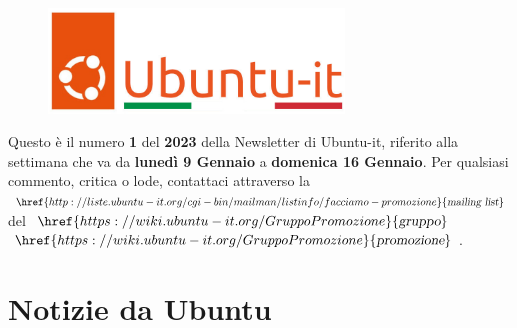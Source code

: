 \documentclass[a4paper,twoside]{article}
\begin{document}
\begin{figure}[!h]
\centering
\includegraphics[width=0.7\textwidth]{immagini/newlogo1.png}
\end{figure}
\vspace{0.30cm}
Questo è il numero \textbf{1} del \textbf{2023} della Newsletter di Ubuntu-it, riferito alla settimana che va da \textbf{lunedì 9 Gennaio} a \textbf{domenica 16 Gennaio}. Per qualsiasi commento, critica o  lode, contattaci attraverso la $\href{http://liste.ubuntu-it.org/cgi-bin/mailman/listinfo/facciamo-promozione}{\textsl{mailing list}}$ del $\href{https://wiki.ubuntu-it.org/GruppoPromozione}{\textsl{gruppo}}$ $\href{https://wiki.ubuntu-it.org/GruppoPromozione}{\textsl{promozione}}$.


\section{Notizie da Ubuntu}
\end{document}
